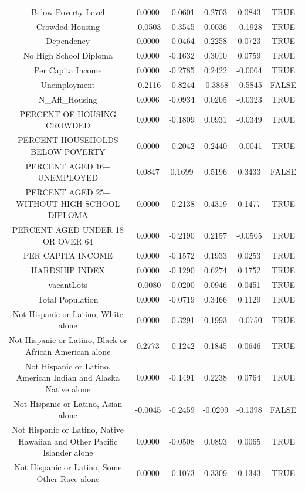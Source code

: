 \documentclass{article} %
\begin{document}
\begin{table}[H]
\begin{adjustbox}{width = \textwidth}
\begin{tabular}{cccccc}
  Below Poverty Level & 0.0000 & -0.0601 & 0.2703 & 0.0843 & TRUE \\ 
  Crowded Housing & -0.0503 & -0.3545 & 0.0036 & -0.1928 & TRUE \\ 
  Dependency & 0.0000 & -0.0464 & 0.2258 & 0.0723 & TRUE \\ 
  No High School Diploma & 0.0000 & -0.1632 & 0.3010 & 0.0759 & TRUE \\ 
  Per Capita Income & 0.0000 & -0.2785 & 0.2422 & -0.0064 & TRUE \\ 
  Unemployment & -0.2116 & -0.8244 & -0.3868 & -0.5845 & FALSE \\ 
  N\_Aff\_Housing & 0.0006 & -0.0934 & 0.0205 & -0.0323 & TRUE \\ 
  PERCENT OF HOUSING CROWDED & 0.0000 & -0.1809 & 0.0931 & -0.0349 & TRUE \\ 
  PERCENT HOUSEHOLDS BELOW POVERTY & 0.0000 & -0.2042 & 0.2440 & -0.0041 & TRUE \\ 
  PERCENT AGED 16+ UNEMPLOYED & 0.0847 & 0.1699 & 0.5196 & 0.3433 & FALSE \\ 
  PERCENT AGED 25+ WITHOUT HIGH SCHOOL DIPLOMA & 0.0000 & -0.2138 & 0.4319 & 0.1477 & TRUE \\ 
  PERCENT AGED UNDER 18 OR OVER 64 & 0.0000 & -0.2190 & 0.2157 & -0.0505 & TRUE \\ 
  PER CAPITA INCOME & 0.0000 & -0.1572 & 0.1933 & 0.0253 & TRUE \\ 
  HARDSHIP INDEX & 0.0000 & -0.1290 & 0.6274 & 0.1752 & TRUE \\ 
  vacantLots & -0.0080 & -0.0200 & 0.0946 & 0.0451 & TRUE \\ 
  Total Population & 0.0000 & -0.0719 & 0.3466 & 0.1129 & TRUE \\ 
  Not Hispanic or Latino, White alone & 0.0000 & -0.3291 & 0.1993 & -0.0750 & TRUE \\ 
  Not Hispanic or Latino, Black or African American alone & 0.2773 & -0.1242 & 0.1845 & 0.0646 & TRUE \\ 
  Not Hispanic or Latino, American Indian and Alaska Native alone & 0.0000 & -0.1491 & 0.2238 & 0.0764 & TRUE \\ 
  Not Hispanic or Latino, Asian alone & -0.0045 & -0.2459 & -0.0209 & -0.1398 & FALSE \\ 
  Not Hispanic or Latino, Native Hawaiian and Other Pacific Islander alone & 0.0000 & -0.0508 & 0.0893 & 0.0065 & TRUE \\ 
  Not Hispanic or Latino, Some Other Race alone & 0.0000 & -0.1073 & 0.3309 & 0.1343 & TRUE \\ 

\end{tabular}
\end{adjustbox}
\end{table}
\end{document}
